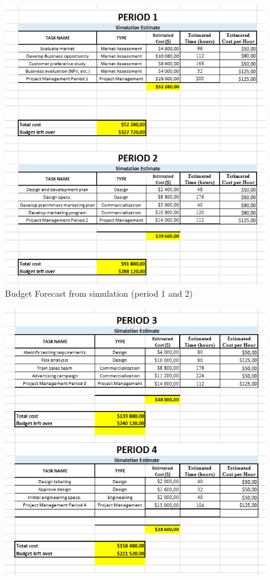 \begin{appendices}
\begin{figure}[H]
\includegraphics[scale=1]{budget_forecast_sim_12.PNG}
\caption{Budget Forecast from simulation (period 1 and 2)}
\end{figure}
\begin{figure}[H]
\includegraphics[scale=1]{budget_forecast_sim_34.PNG}

\end{figure}
\end{appendices}

